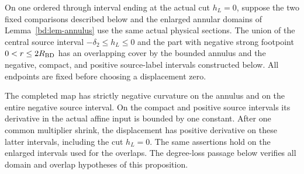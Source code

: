 \begin{proposition}
\label{bd:prop-bounded-action}
On one ordered through interval ending at the actual cut \(h_L=0\),
suppose the two fixed comparisons described below and the enlarged
annular domains of Lemma~\ref{bd:lem-annulus} use the same actual
physical sections. The union of the central source interval
\(-\delta_2\le h_L\le0\) and the part with negative strong
footpoint \(0<r\le2R_{\rm BD}\) has an overlapping cover by the
bounded annulus and the negative, compact, and positive source-label
intervals constructed below. All endpoints are fixed before choosing
a displacement zero.

The completed map has strictly negative curvature on the annulus and
on the entire negative source interval. On the compact and positive
source intervals its derivative in the actual affine input is bounded
by one constant. After one common multiplier shrink, the displacement
has positive derivative on these latter intervals, including the cut
\(h_L=0\). The same assertions hold on the enlarged intervals used
for the overlaps. The degree-loss passage below verifies all domain
and overlap hypotheses of this proposition.
\end{proposition}
